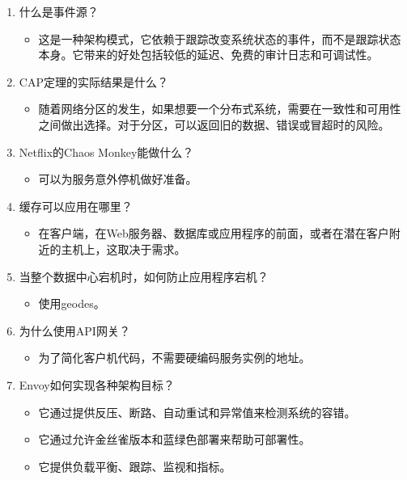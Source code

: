 \begin{enumerate}
\item
什么是事件源？
\begin{itemize}
\item 
这是一种架构模式，它依赖于跟踪改变系统状态的事件，而不是跟踪状态本身。它带来的好处包括较低的延迟、免费的审计日志和可调试性。
\end{itemize}

\item 
CAP定理的实际结果是什么？
\begin{itemize}
\item 
随着网络分区的发生，如果想要一个分布式系统，需要在一致性和可用性之间做出选择。对于分区，可以返回旧的数据、错误或冒超时的风险。
\end{itemize}

\item 
Netflix的Chaos Monkey能做什么？
\begin{itemize}
\item 
可以为服务意外停机做好准备。
\end{itemize}

\item 
缓存可以应用在哪里？
\begin{itemize}
\item 
在客户端，在Web服务器、数据库或应用程序的前面，或者在潜在客户附近的主机上，这取决于需求。
\end{itemize}

\item 
当整个数据中心宕机时，如何防止应用程序宕机？
\begin{itemize}
\item 
使用geodes。
\end{itemize}

\item 
为什么使用API网关？
\begin{itemize}
\item 
为了简化客户机代码，不需要硬编码服务实例的地址。
\end{itemize}

\item 
Envoy如何实现各种架构目标？
\begin{itemize}
\item 
它通过提供反压、断路、自动重试和异常值来检测系统的容错。

\item 
它通过允许金丝雀版本和蓝绿色部署来帮助可部署性。

\item 
它提供负载平衡、跟踪、监视和指标。
\end{itemize}
\end{enumerate}